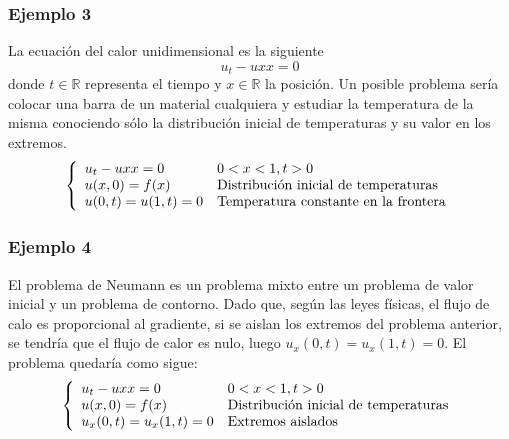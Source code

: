 \subsubsection*{Ejemplo 3}
La ecuación del calor unidimensional es la siguiente
$$u_t-uxx=0$$
donde $t\in\mathbb{R}$ representa el tiempo y $x\in\mathbb{R}$ la posición.
Un posible problema sería colocar una barra de un material cualquiera y estudiar la temperatura de la misma conociendo sólo la distribución inicial de temperaturas y su valor en los extremos.
\begin{equation*}
\left\{
\begin{array}{l l}
u_t-uxx=0 & 0<x<1, t>0\\
u(x,0)=f(x)& \text{Distribución inicial de temperaturas}\\
u(0,t)=u(1,t) = 0 & \text{Temperatura constante en la frontera}
\end{array}
\right.
\end{equation*}

\subsubsection*{Ejemplo 4}
El problema de Neumann es un problema mixto entre un problema de valor inicial y un problema de contorno. Dado que, según las leyes físicas, el flujo de calo es proporcional al gradiente, si se aislan los extremos del problema anterior, se tendría que el flujo de calor es nulo, luego $u_x(0,t)=u_x(1,t) = 0$. El problema quedaría como sigue:
\begin{equation*}
\left\{
\begin{array}{l l}
u_t-uxx=0 & 0<x<1, t>0\\
u(x,0)=f(x)& \text{Distribución inicial de temperaturas}\\
u_x(0,t)=u_x(1,t) = 0 & \text{Extremos aislados}
\end{array}
\right.
\end{equation*}